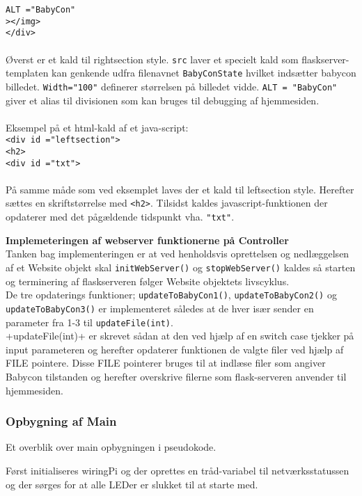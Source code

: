 \verb+ALT ="BabyCon"+\\
\verb+></img>+\\
\verb+</div>+\\
\\Øverst er et kald til rightsection style. \verb+src+ laver et specielt kald som flaskserver-templaten kan genkende udfra filenavnet \verb+BabyConState+ hvilket indsætter babycon billedet. \verb+Width="100"+ definerer størrelsen på billedet vidde. \verb+ALT = "BabyCon"+ giver et alias til divisionen som kan bruges til debugging af hjemmesiden.\\
\\Eksempel på et html-kald af et java-script:\\
\verb+<div id ="leftsection">+ \\
\verb+<h2>+ \\
\verb+<div id ="txt">+ \\
\\På samme måde som ved eksemplet laves der et kald til leftsection style. Herefter sættes en skriftstørrelse med \verb+<h2>+. Tilsidst kaldes javascript-funktionen der opdaterer med det pågældende tidspunkt vha. \verb+"txt"+.

\textbf{Implemeteringen af webserver funktionerne på Controller} \\
Tanken bag implementeringen er at ved henholdsvis oprettelsen og nedlæggelsen af et Website objekt skal \verb+initWebServer()+ og \verb+stopWebServer()+ kaldes så starten og terminering af flaskserveren følger Website objektets livscyklus. \\ 
De tre opdaterings funktioner; \verb+updateToBabyCon1()+, \verb+updateToBabyCon2()+ og \verb+updateToBabyCon3()+ er implementeret således at de hver især sender en parameter fra 1-3 til \verb+updateFile(int)+. \\ 
+updateFile(int)+ er skrevet sådan at den ved hjælp af en switch case tjekker på input parameteren og herefter opdaterer funktionen de valgte filer ved hjælp af FILE pointere. Disse FILE pointerer bruges til at indlæse filer som angiver Babycon tilstanden og herefter overskrive filerne som flask-serveren anvender til hjemmesiden.

\subsubsection*{Opbygning af Main}

Et overblik over main opbygningen i pseudokode. 

Først initialiseres wiringPi og der oprettes en tråd-variabel til netværksstatussen og der sørges for at alle LEDer er slukket til at starte med.  


